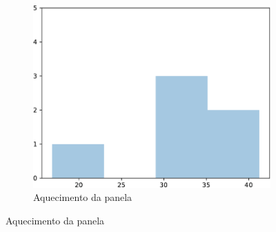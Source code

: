 \documentclass[12pt]{article}
\begin{document}
\begin{figure}[h]
\begin{subfigure}[b]{0.33\textwidth}
     \end{subfigure}%
     \hfill
     \begin{subfigure}[b]{0.33\textwidth}%
         \centering
         \includegraphics[width=\textwidth]{figuras/aquecimento_panela}
         \caption{Aquecimento da panela}
         \label{fig:hist_aquecimento_panela}
     \end{subfigure}%
     
     \nointerlineskip
     \vspace{4pt}
     

\end{figure}
\end{document}
